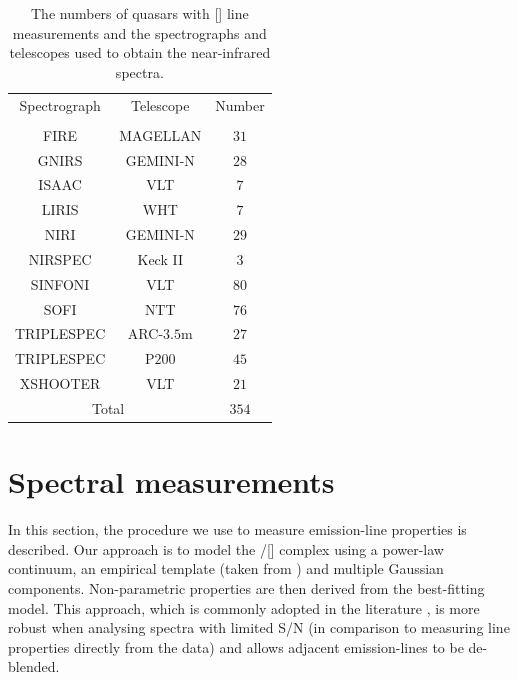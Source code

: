\begin{table}
  \centering
  \footnotesize 
    \begin{tabular}{ccc} 
    \hline
    Spectrograph & Telescope & Number \\
                 &           & \\
    \hline
    FIRE         & MAGELLAN  & $31$ \\
    GNIRS        & GEMINI-N  & $28$ \\
    ISAAC        & VLT       & $7$ \\
    LIRIS        & WHT       & $7$ \\
    NIRI         & GEMINI-N  & $29$ \\
    NIRSPEC      & Keck II   & $3$ \\
    SINFONI      & VLT       & $80$ \\
    SOFI         & NTT       & $76$ \\
    TRIPLESPEC   & ARC-$3.5$m  & $27$ \\
    TRIPLESPEC   & P$200$      & $45$ \\
    XSHOOTER     & VLT       & $21$ \\
    \hline
    \multicolumn{2}{c}{Total} & $354$ \\
    \hline
    \end{tabular}
    \caption[{The numbers of quasars with [] line measurements and the spectrographs and telescopes used to obtain the near-infrared spectra.}]{The numbers of quasars with [] line measurements and the spectrographs and telescopes used to obtain the near-infrared spectra.}
  \label{tab:specnums_ch4}
\end{table} 

\section{Spectral measurements}

In this section, the procedure we use to measure emission-line properties is described.  
Our approach is to model the \hbns/[] complex using a power-law continuum, an empirical  template (taken from \citealt{boroson92}) and multiple Gaussian components.
Non-parametric properties are then derived from the best-fitting model. 
This approach, which is commonly adopted in the literature \citep[e.g.][]{shen11,shen12,shen16a}, is more robust when analysing spectra with limited S/N (in comparison to measuring line properties directly from the data) and allows adjacent emission-lines to be de-blended.

